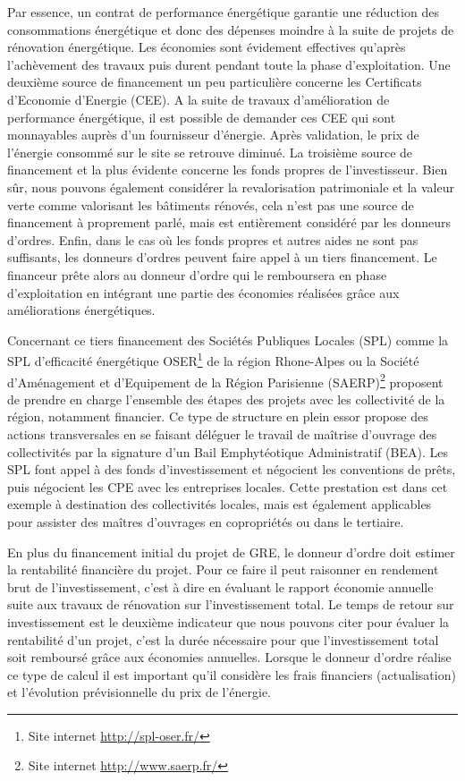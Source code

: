 Par essence, un contrat de performance énergétique garantie une réduction des consommations énergétique et donc des dépenses moindre à la suite de projets de rénovation énergétique. Les économies sont évidement effectives qu'après l'achèvement des travaux puis durent pendant toute la phase d'exploitation. Une deuxième source de financement un peu particulière concerne les Certificats d'Economie d'Energie (CEE). A la suite de travaux d'amélioration de performance énergétique, il est possible de demander ces CEE qui sont monnayables auprès d'un fournisseur d'énergie. Après validation, le prix de l'énergie consommé sur le site se retrouve diminué. La troisième source de financement et la plus évidente concerne les fonds propres de l'investisseur. Bien sûr, nous pouvons également considérer la revalorisation patrimoniale et la valeur verte comme valorisant les bâtiments rénovés, cela n'est pas une source de financement à proprement parlé, mais est entièrement considéré par les donneurs d'ordres. Enfin, dans le cas où les fonds propres et autres aides ne sont pas suffisants, les donneurs d'ordres peuvent faire appel à un tiers financement. Le financeur prête alors au donneur d'ordre qui le remboursera en phase d'exploitation en intégrant une partie des économies réalisées grâce aux améliorations énergétiques.

Concernant ce tiers financement des Sociétés Publiques Locales (SPL) comme la SPL d'efficacité énergétique OSER\footnote{Site internet \url{http://spl-oser.fr/}} de la région Rhone-Alpes ou la Société d'Aménagement et d'Equipement de la Région Parisienne (SAERP)\footnote{Site internet \url{http://www.saerp.fr/}} proposent de prendre en charge l'ensemble des étapes des projets avec les collectivité de la région, notamment financier. Ce type de structure en plein essor propose des actions transversales en se faisant déléguer le travail de maîtrise d'ouvrage des collectivités par la signature d'un Bail Emphytéotique Administratif (BEA). Les SPL font appel à des fonds d'investissement et négocient les conventions de prêts, puis négocient les CPE avec les entreprises locales. Cette prestation est dans cet exemple à destination des collectivités locales, mais est également applicables pour assister des maîtres d'ouvrages en copropriétés ou dans le tertiaire.

En plus du financement initial du projet de GRE, le donneur d'ordre doit estimer la rentabilité financière du projet. Pour ce faire il peut raisonner en rendement brut de l'investissement, c'est à dire en évaluant le rapport économie annuelle suite aux travaux de rénovation sur l'investissement total. Le temps de retour sur investissement est le deuxième indicateur que nous pouvons citer pour évaluer la rentabilité d'un projet, c'est la durée nécessaire pour que l'investissement total soit remboursé grâce aux économies annuelles. Lorsque le donneur d'ordre réalise ce type de calcul il est important qu'il considère les frais financiers (actualisation) et l'évolution prévisionnelle du prix de l'énergie.

